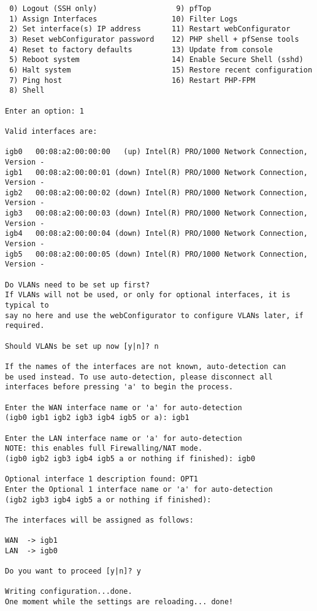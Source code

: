 \begin{enumerate}
\begin{verbatim}
 0) Logout (SSH only)                  9) pfTop
 1) Assign Interfaces                 10) Filter Logs
 2) Set interface(s) IP address       11) Restart webConfigurator
 3) Reset webConfigurator password    12) PHP shell + pfSense tools
 4) Reset to factory defaults         13) Update from console
 5) Reboot system                     14) Enable Secure Shell (sshd)
 6) Halt system                       15) Restore recent configuration
 7) Ping host                         16) Restart PHP-FPM
 8) Shell
  
Enter an option: 1

Valid interfaces are:

igb0   00:08:a2:00:00:00   (up) Intel(R) PRO/1000 Network Connection, Version - 
igb1   00:08:a2:00:00:01 (down) Intel(R) PRO/1000 Network Connection, Version - 
igb2   00:08:a2:00:00:02 (down) Intel(R) PRO/1000 Network Connection, Version - 
igb3   00:08:a2:00:00:03 (down) Intel(R) PRO/1000 Network Connection, Version - 
igb4   00:08:a2:00:00:04 (down) Intel(R) PRO/1000 Network Connection, Version - 
igb5   00:08:a2:00:00:05 (down) Intel(R) PRO/1000 Network Connection, Version - 

Do VLANs need to be set up first?
If VLANs will not be used, or only for optional interfaces, it is typical to
say no here and use the webConfigurator to configure VLANs later, if required.

Should VLANs be set up now [y|n]? n

If the names of the interfaces are not known, auto-detection can
be used instead. To use auto-detection, please disconnect all
interfaces before pressing 'a' to begin the process.

Enter the WAN interface name or 'a' for auto-detection 
(igb0 igb1 igb2 igb3 igb4 igb5 or a): igb1

Enter the LAN interface name or 'a' for auto-detection 
NOTE: this enables full Firewalling/NAT mode.
(igb0 igb2 igb3 igb4 igb5 a or nothing if finished): igb0

Optional interface 1 description found: OPT1
Enter the Optional 1 interface name or 'a' for auto-detection
(igb2 igb3 igb4 igb5 a or nothing if finished): 

The interfaces will be assigned as follows:

WAN  -> igb1
LAN  -> igb0

Do you want to proceed [y|n]? y

Writing configuration...done.
One moment while the settings are reloading... done!
\end{verbatim}


\end{enumerate}
